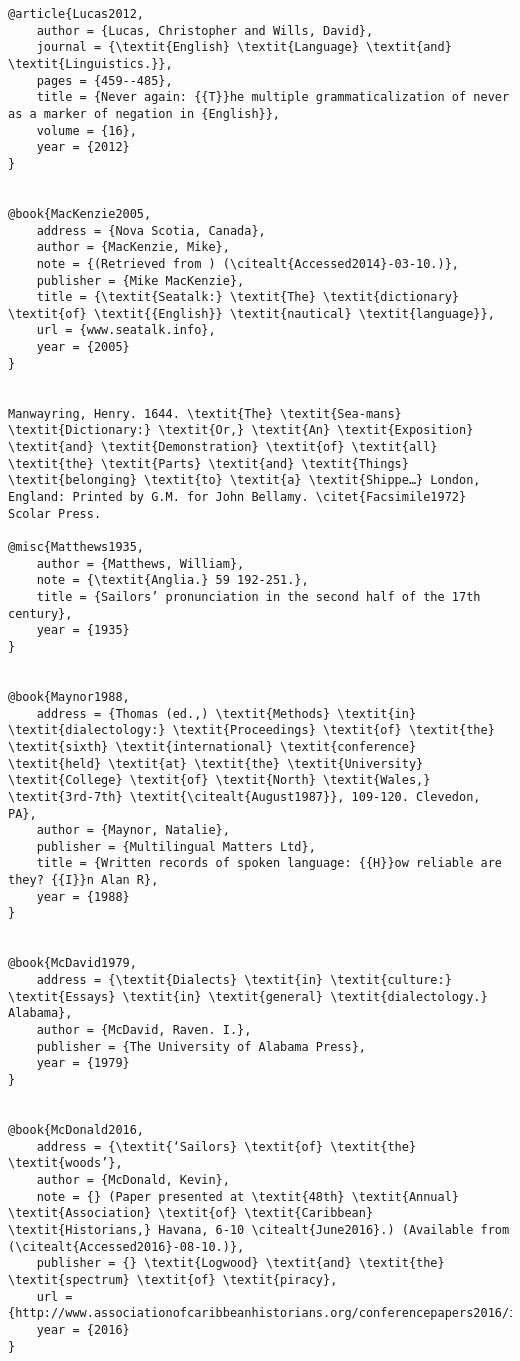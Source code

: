 \begin{verbatim}
@article{Lucas2012,
	author = {Lucas, Christopher and Wills, David},
	journal = {\textit{English} \textit{Language} \textit{and} \textit{Linguistics.}},
	pages = {459--485},
	title = {Never again: {{T}}he multiple grammaticalization of never as a marker of negation in {English}},
	volume = {16},
	year = {2012}
}


@book{MacKenzie2005,
	address = {Nova Scotia, Canada},
	author = {MacKenzie, Mike},
	note = {(Retrieved from ) (\citealt{Accessed2014}-03-10.)},
	publisher = {Mike MacKenzie},
	title = {\textit{Seatalk:} \textit{The} \textit{dictionary} \textit{of} \textit{{English}} \textit{nautical} \textit{language}},
	url = {www.seatalk.info},
	year = {2005}
}


Manwayring, Henry. 1644. \textit{The} \textit{Sea-mans} \textit{Dictionary:} \textit{Or,} \textit{An} \textit{Exposition} \textit{and} \textit{Demonstration} \textit{of} \textit{all} \textit{the} \textit{Parts} \textit{and} \textit{Things} \textit{belonging} \textit{to} \textit{a} \textit{Shippe…} London, England: Printed by G.M. for John Bellamy. \citet{Facsimile1972} Scolar Press.

@misc{Matthews1935,
	author = {Matthews, William},
	note = {\textit{Anglia.} 59 192-251.},
	title = {Sailors’ pronunciation in the second half of the 17th century},
	year = {1935}
}


@book{Maynor1988,
	address = {Thomas (ed.,) \textit{Methods} \textit{in} \textit{dialectology:} \textit{Proceedings} \textit{of} \textit{the} \textit{sixth} \textit{international} \textit{conference} \textit{held} \textit{at} \textit{the} \textit{University} \textit{College} \textit{of} \textit{North} \textit{Wales,} \textit{3rd-7th} \textit{\citealt{August1987}}, 109-120. Clevedon, PA},
	author = {Maynor, Natalie},
	publisher = {Multilingual Matters Ltd},
	title = {Written records of spoken language: {{H}}ow reliable are they? {{I}}n Alan R},
	year = {1988}
}


@book{McDavid1979,
	address = {\textit{Dialects} \textit{in} \textit{culture:} \textit{Essays} \textit{in} \textit{general} \textit{dialectology.} Alabama},
	author = {McDavid, Raven. I.},
	publisher = {The University of Alabama Press},
	year = {1979}
}


@book{McDonald2016,
	address = {\textit{‘Sailors} \textit{of} \textit{the} \textit{woods’},
	author = {McDonald, Kevin},
	note = {} (Paper presented at \textit{48th} \textit{Annual} \textit{Association} \textit{of} \textit{Caribbean} \textit{Historians,} Havana, 6-10 \citealt{June2016}.) (Available from  (\citealt{Accessed2016}-08-10.)},
	publisher = {} \textit{Logwood} \textit{and} \textit{the} \textit{spectrum} \textit{of} \textit{piracy},
	url = {http://www.associationofcaribbeanhistorians.org/conferencepapers2016/index.htm)},
	year = {2016}
}



\end{verbatim}
